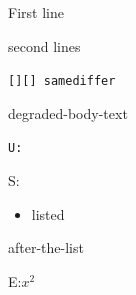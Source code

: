 \IfFileExists{ltxo-no-such-class.cls}{\documentclass{ltxo-no-such-class}}{\documentclass[12pt]{article}}
\begin{document}
First line

second lines

\texttt{[\meaning\CurrentFile][\meaning\CurrentFilePathUsed]
\ifx\CurrentFile\CurrentFileUsed same\else differ\fi}

degraded-body-text

\makeatletter
\texttt{U:\meaning\@@underline}
\makeatother

S:\thesection

\begin{itemize}\item listed\end{itemize}
after-the-list

E:\ensuremath{x^2}

\end{document}
